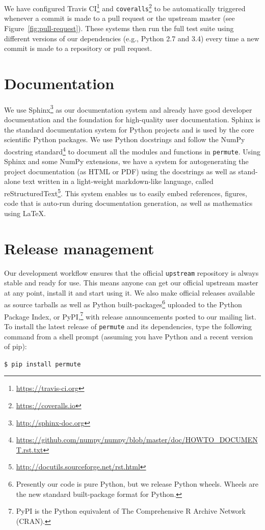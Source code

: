 We have configured Travis CI\footnote{\url{https://travis-ci.org}} and
\texttt{coveralls}\footnote{\url{https://coveralls.io}} to be automatically
triggered whenever a commit is made to a pull request or the upstream master
(see Figure~\ref{fig:pull-request}).  These systems then run the full
test suite  using different versions of our dependencies (e.g., Python 2.7 and
3.4) every time a new commit is made to a repository or pull request.

\section{\label{sec:doc}Documentation}

We use Sphinx\footnote{\url{http://sphinx-doc.org}} as our documentation system
and already have good developer documentation and the foundation for
high-quality user documentation. Sphinx is the standard documentation system
for Python projects and is used by the core scientific Python packages.
We use Python docstrings and follow the NumPy docstring
standard\footnote{\url{https://github.com/numpy/numpy/blob/master/doc/HOWTO\_DOCUMENT.rst.txt}}
to document all the modules and functions in \texttt{permute}.  Using Sphinx
and some NumPy extensions, we have a system for autogenerating the project
documentation (as HTML or PDF) using the docstrings as well as stand-alone text
written in a light-weight markdown-like language, called
reStructuredText\footnote{\url{http://docutils.sourceforge.net/rst.html}}.
This system enables us to easily embed references, figures, code that is
auto-run during documentation generation, as well as mathematics using \LaTeX.

\section{\label{sec:release}Release management}

Our development workflow ensures that the official \texttt{upstream} repository
is always stable and ready for use.  This means anyone can get our official
upstream master at any point, install it and start using it.  We also make
official releases available as source tarballs as well as Python
built-packages\footnote{Presently our code is pure Python, but we release
Python wheels.  Wheels are the new standard built-package format for Python.}
uploaded to the Python Package Index, or PyPI,\footnote{PyPI is the Python
equivalent of The Comprehensive R Archive Network (CRAN).} with release
announcements posted to our mailing list.  To install the latest release of
\texttt{permute} and its dependencies, type the following command from a shell
prompt (assuming you have Python and a recent version of pip): 

\texttt{\$ pip install permute}
